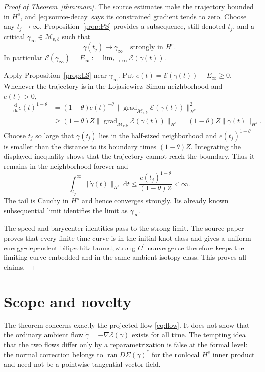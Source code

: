 \documentclass[11pt]{article}
\theoremstyle{remark}
\newcommand{\E}{\mathcal E}
\newcommand{\M}{\mathcal M}
\newcommand{\dd}{\,\mathrm d}
\newcommand{\grad}{\operatorname{grad}}
\begin{document}
\begin{proof}[Proof of Theorem~\ref{thm:main}]
The source estimates make the trajectory bounded in $H^s$, and
\eqref{eq:source-decay} says its constrained gradient tends to zero.  Choose
any $t_j\to\infty$.  Proposition~\ref{prop:PS} provides a subsequence, still
denoted $t_j$, and a critical $\gamma_\infty\in\M_{v,b}$ such that
\[
 \gamma(t_j)\longrightarrow\gamma_\infty\quad\text{strongly in }H^s.
\]
In particular $\E(\gamma_\infty)=E_\infty:=\lim_{t\to\infty}\E(\gamma(t))$.

Apply Proposition~\ref{prop:LS} near $\gamma_\infty$.  Put
$e(t)=\E(\gamma(t))-E_\infty\ge0$.  Whenever the trajectory is in the
Lojasiewicz--Simon neighborhood and $e(t)>0$,
\begin{align*}
 -\frac{\dd}{\dd t}e(t)^{1-\theta}
 &= (1-\theta)e(t)^{-\theta}
    \|\grad_{\M_{v,b}}\E(\gamma(t))\|_{H^s}^2\\
 &\ge (1-\theta)Z
    \|\grad_{\M_{v,b}}\E(\gamma(t))\|_{H^s}
  =(1-\theta)Z\|\dot\gamma(t)\|_{H^s}.
\end{align*}
Choose $t_j$ so large that $\gamma(t_j)$ lies in the half-sized
neighborhood and $e(t_j)^{1-\theta}$ is smaller than the distance to its
boundary times $(1-\theta)Z$.  Integrating the displayed inequality shows
that the trajectory cannot reach the boundary.  Thus it remains in the
neighborhood forever and
\[
 \int_{t_j}^{\infty}\|\dot\gamma(t)\|_{H^s}\dd t
 \le \frac{e(t_j)^{1-\theta}}{(1-\theta)Z}<\infty.
\]
The tail is Cauchy in $H^s$ and hence converges strongly.  Its already known
subsequential limit identifies the limit as $\gamma_\infty$.

The speed and barycenter identities pass to the strong limit.  The source
paper proves that every finite-time curve is in the initial knot class and
gives a uniform energy-dependent bilipschitz bound; strong $C^1$ convergence
therefore keeps the limiting curve embedded and in the same ambient isotopy
class.  This proves all claims.
\end{proof}

\section{Scope and novelty}

The theorem concerns exactly the projected flow \eqref{eq:flow}.  It does not
show that the ordinary ambient flow $\dot\gamma=-\nabla\E(\gamma)$ exists for
all time.  The tempting idea that the two flows differ only by a
reparametrization is false at the formal level: the normal correction belongs
to $\operatorname{ran}D\Sigma(\gamma)^*$ for the nonlocal $H^s$ inner product
and need not be a pointwise tangential vector field.
\end{document}
